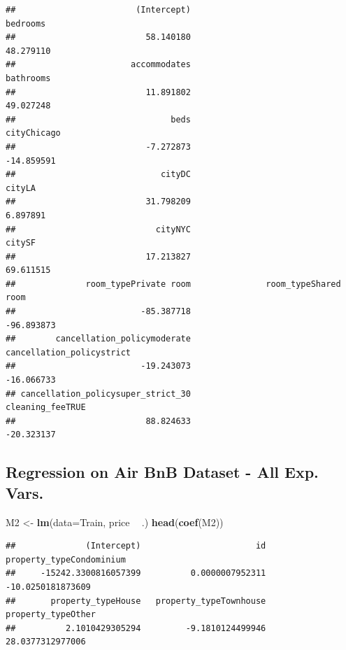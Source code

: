 \documentclass[]{book}
\newenvironment{Shaded}{\begin{snugshade}}{\end{snugshade}}
\newcommand{\KeywordTok}[1]{\textcolor[rgb]{0.13,0.29,0.53}{\textbf{#1}}}
\newcommand{\DataTypeTok}[1]{\textcolor[rgb]{0.13,0.29,0.53}{#1}}
\newcommand{\StringTok}[1]{\textcolor[rgb]{0.31,0.60,0.02}{#1}}
\newcommand{\OperatorTok}[1]{\textcolor[rgb]{0.81,0.36,0.00}{\textbf{#1}}}
\newcommand{\NormalTok}[1]{#1}
\begin{document}
\begin{verbatim}
##                        (Intercept)                           bedrooms 
##                          58.140180                          48.279110 
##                       accommodates                          bathrooms 
##                          11.891802                          49.027248 
##                               beds                        cityChicago 
##                          -7.272873                         -14.859591 
##                             cityDC                             cityLA 
##                          31.798209                           6.897891 
##                            cityNYC                             citySF 
##                          17.213827                          69.611515 
##              room_typePrivate room               room_typeShared room 
##                         -85.387718                         -96.893873 
##        cancellation_policymoderate          cancellation_policystrict 
##                         -19.243073                         -16.066733 
## cancellation_policysuper_strict_30                   cleaning_feeTRUE 
##                          88.824633                         -20.323137
\end{verbatim}

\subsection{Regression on Air BnB Dataset - All Exp.
Vars.}\label{regression-on-air-bnb-dataset---all-exp.-vars.}

\begin{Shaded}
\begin{Highlighting}[]
\NormalTok{M2 <-}\StringTok{ }\KeywordTok{lm}\NormalTok{(}\DataTypeTok{data=}\NormalTok{Train, price }\OperatorTok{~}\StringTok{ }\NormalTok{.)}
\KeywordTok{head}\NormalTok{(}\KeywordTok{coef}\NormalTok{(M2))}
\end{Highlighting}
\end{Shaded}

\begin{verbatim}
##              (Intercept)                       id property_typeCondominium 
##     -15242.3300816057399          0.0000007952311        -10.0250181873609 
##       property_typeHouse   property_typeTownhouse       property_typeOther 
##          2.1010429305294         -9.1810124499946         28.0377312977006
\end{verbatim}
\end{document}
